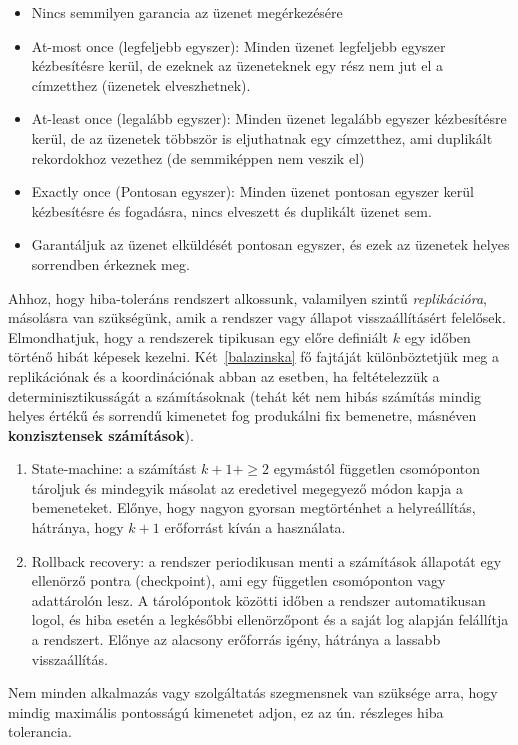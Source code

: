 \documentclass[a4paper,12pt]{article}
\begin{document}
\begin{itemize}
\item Nincs semmilyen garancia az üzenet megérkezésére
\item At-most once (legfeljebb egyszer): Minden üzenet legfeljebb egyszer kézbesítésre kerül, de ezeknek az üzeneteknek egy rész nem jut el a címzetthez (üzenetek elveszhetnek).
\item At-least once (legalább egyszer): Minden üzenet legalább egyszer kézbesítésre kerül, de az üzenetek többször is eljuthatnak egy címzetthez, ami duplikált rekordokhoz vezethez (de semmiképpen nem veszik el)
\item Exactly once (Pontosan egyszer): Minden üzenet pontosan egyszer kerül kézbesítésre és fogadásra, nincs elveszett és duplikált üzenet sem.
\item Garantáljuk az üzenet elküldését pontosan egyszer, és ezek az üzenetek helyes sorrendben érkeznek meg.
\end{itemize}

Ahhoz, hogy hiba-toleráns rendszert alkossunk, valamilyen szintű \textit{replikációra}, másolásra van szükségünk, amik a rendszer vagy állapot visszaállításért felelősek. Elmondhatjuk, hogy a rendszerek tipikusan egy előre definiált $k$ egy időben történő hibát képesek kezelni. Két~\ref{balazinska} fő fajtáját különböztetjük meg a replikációnak és a koordinációnak abban az esetben, ha feltételezzük a determinisztikusságát a számításoknak (tehát két nem hibás számítás mindig helyes értékű és sorrendű kimenetet fog produkálni fix bemenetre, másnéven \textbf{konzisztensek számítások}). 

\begin{enumerate}
\item State-machine: a számítást $k+1+\ge2$ egymástól független csomóponton tároljuk és mindegyik másolat az eredetivel megegyező módon kapja a bemeneteket. Előnye, hogy nagyon gyorsan megtörténhet a helyreállítás, hátránya, hogy $k+1$ erőforrást kíván a használata.
\item Rollback recovery: a rendszer periodikusan menti a számítások állapotát egy ellenörző pontra (checkpoint), ami egy független csomóponton vagy adattárolón lesz. A tárolópontok közötti időben a rendszer automatikusan logol, és hiba esetén a legkésőbbi ellenörzőpont és a saját log alapján felállítja a rendszert. Előnye az alacsony erőforrás igény, hátránya a lassabb visszaállítás. 
\end{enumerate}

Nem minden alkalmazás vagy szolgáltatás szegmensnek van szüksége arra, hogy mindig maximális pontosságú kimenetet adjon, ez az ún. részleges hiba tolerancia. 
\end{document}
